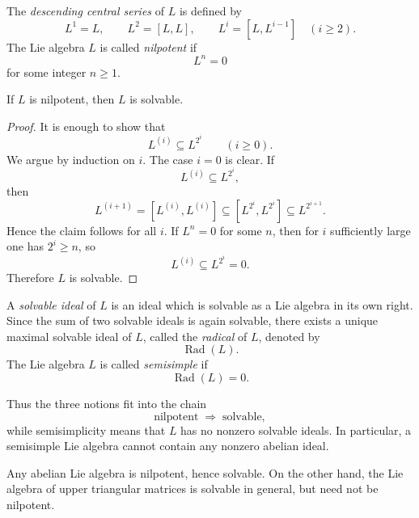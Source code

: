 \documentclass[11pt, a4paper]{report}
\begin{document}
\begin{definition}
The \emph{descending central series} of \(L\) is defined by
\[
L^1=L, \qquad L^2=[L,L], \qquad L^i=[L,L^{i-1}]\quad (i\ge 2).
\]
The Lie algebra \(L\) is called \emph{nilpotent} if
\[
L^n=0
\]
for some integer \(n\ge 1\).
\end{definition}

\begin{proposition}
If \(L\) is nilpotent, then \(L\) is solvable.
\end{proposition}

\begin{proof}
It is enough to show that
\[
L^{(i)}\subseteq L^{2^i}\qquad (i\ge 0).
\]
We argue by induction on \(i\). The case \(i=0\) is clear. If
\[
L^{(i)}\subseteq L^{2^i},
\]
then
\[
L^{(i+1)}
=
[L^{(i)},L^{(i)}]
\subseteq
[L^{2^i},L^{2^i}]
\subseteq
L^{2^{i+1}}.
\]
Hence the claim follows for all \(i\). If \(L^n=0\) for some \(n\), then for \(i\) sufficiently large one has \(2^i\ge n\), so
\[
L^{(i)}\subseteq L^{2^i}=0.
\]
Therefore \(L\) is solvable.
\end{proof}

\begin{definition}
A \emph{solvable ideal} of \(L\) is an ideal which is solvable as a Lie algebra in its own right. Since the sum of two solvable ideals is again solvable, there exists a unique maximal solvable ideal of \(L\), called the \emph{radical} of \(L\), denoted by
\[
\operatorname{Rad}(L).
\]
The Lie algebra \(L\) is called \emph{semisimple} if
\[
\operatorname{Rad}(L)=0.
\]
\end{definition}

\begin{remark}
Thus the three notions fit into the chain
\[
\text{nilpotent} \;\Longrightarrow\; \text{solvable},
\]
while semisimplicity means that \(L\) has no nonzero solvable ideals. In particular, a semisimple Lie algebra cannot contain any nonzero abelian ideal.
\end{remark}

\begin{example}
Any abelian Lie algebra is nilpotent, hence solvable. On the other hand, the Lie algebra of upper triangular matrices is solvable in general, but need not be nilpotent.
\end{example}
\end{document}
